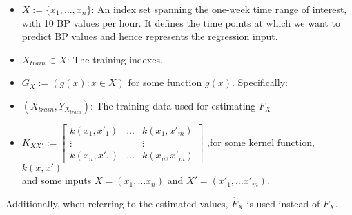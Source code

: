\begin{itemize}
    \item $X := \{ x_1, \dots, x_n \}$: An index set spanning the one-week time
    range of interest, with 10 BP values per hour.
    It defines the time points at
    which we want to predict BP values and hence represents the regression input.

    \item $X_{train} \subset X$: The training indexes. \\

    \item $G_X := (g(x) : x \in X )$ for some function $g(x)$.
    Specifically:


    \item $(X_{train}, Y_{X_{train}})$: The training data used for estimating $F_X$



    \item $K_{XX'} := \begin{bmatrix}
            k(x_1, x'_1) & \dots & k(x_1, x'_m)\\
            \vdots  &  & \vdots \\
            k(x_n, x'_1) & \dots  & k(x_n, x'_m)
         \end{bmatrix}$ ,for some kernel function, $k(x, x')$ \\

        and some inputs $X=(x_1, \dots x_n)$ and $X'=(x'_1, \dots x'_m)$.
\end{itemize}

Additionally, when referring to the estimated values,
$\hat{F}_X$ is used instead of $F_X$.


